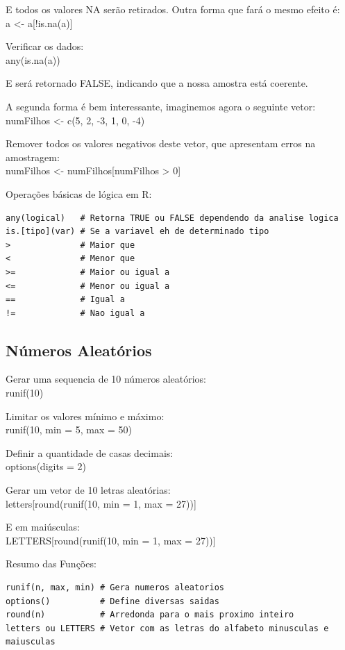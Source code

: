 \documentclass[a4paper,11pt]{article}
\begin{document}
E todos os valores NA serão retirados. Outra forma que fará o mesmo efeito é: \\
{\ttfamily a <- a[!is.na(a)]}

Verificar os dados: \\
{\ttfamily any(is.na(a))}

E será retornado FALSE, indicando que a nossa amostra está coerente. 

A segunda forma é bem interessante, imaginemos agora o seguinte vetor: \\
{\ttfamily numFilhos <- c(5, 2, -3, 1, 0, -4)}

Remover todos os valores negativos deste vetor, que apresentam erros na amostragem: \\
{\ttfamily numFilhos <- numFilhos[numFilhos > 0]}

Operações básicas de lógica em R:
\begin{lstlisting}
any(logical)   # Retorna TRUE ou FALSE dependendo da analise logica
is.[tipo](var) # Se a variavel eh de determinado tipo
>              # Maior que
<              # Menor que
>=             # Maior ou igual a
<=             # Menor ou igual a
==             # Igual a
!=             # Nao igual a
\end{lstlisting}

\subsection{Números Aleatórios}
Gerar uma sequencia de 10 números aleatórios: \\
{\ttfamily runif(10)}

Limitar os valores mínimo e máximo: \\
{\ttfamily runif(10, min = 5, max = 50)}

Definir a quantidade de casas decimais: \\
{\ttfamily options(digits = 2)}

Gerar um vetor de 10 letras aleatórias: \\
{\ttfamily letters[round(runif(10, min = 1, max = 27))]}

E em maiúsculas: \\
{\ttfamily LETTERS[round(runif(10, min = 1, max = 27))]}

Resumo das Funções:
\begin{lstlisting}
runif(n, max, min) # Gera numeros aleatorios
options()          # Define diversas saidas
round(n)           # Arredonda para o mais proximo inteiro
letters ou LETTERS # Vetor com as letras do alfabeto minusculas e maiusculas
\end{lstlisting}
\end{document}
